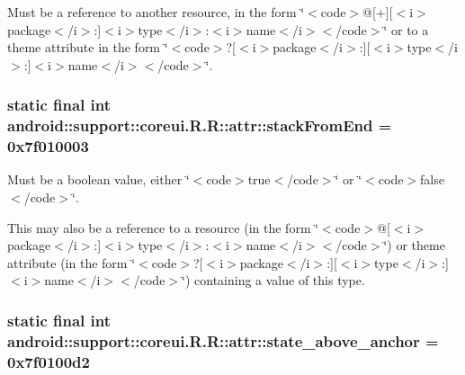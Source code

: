Must be a reference to another resource, in the form \char`\"{}$<$code$>$@\mbox{[}+\mbox{]}\mbox{[}$<$i$>$package$<$/i$>$:\mbox{]}$<$i$>$type$<$/i$>$:$<$i$>$name$<$/i$>$$<$/code$>$\char`\"{} or to a theme attribute in the form \char`\"{}$<$code$>$?\mbox{[}$<$i$>$package$<$/i$>$:\mbox{]}\mbox{[}$<$i$>$type$<$/i$>$:\mbox{]}$<$i$>$name$<$/i$>$$<$/code$>$\char`\"{}. \hypertarget{classandroid_1_1support_1_1coreui_1_1_r_1_1attr_3aa85713027b62eb331fd1fb7c1fbde0}{
\subsubsection[{stackFromEnd}]{\setlength{\rightskip}{0pt plus 5cm}static final int android::support::coreui.R.R::attr::stackFromEnd = 0x7f010003}}
\label{classandroid_1_1support_1_1coreui_1_1_r_1_1attr_3aa85713027b62eb331fd1fb7c1fbde0}


Must be a boolean value, either \char`\"{}$<$code$>$true$<$/code$>$\char`\"{} or \char`\"{}$<$code$>$false$<$/code$>$\char`\"{}. 

This may also be a reference to a resource (in the form \char`\"{}$<$code$>$@\mbox{[}$<$i$>$package$<$/i$>$:\mbox{]}$<$i$>$type$<$/i$>$:$<$i$>$name$<$/i$>$$<$/code$>$\char`\"{}) or theme attribute (in the form \char`\"{}$<$code$>$?\mbox{[}$<$i$>$package$<$/i$>$:\mbox{]}\mbox{[}$<$i$>$type$<$/i$>$:\mbox{]}$<$i$>$name$<$/i$>$$<$/code$>$\char`\"{}) containing a value of this type. \hypertarget{classandroid_1_1support_1_1coreui_1_1_r_1_1attr_bda9448177babf2df5ac91b9f0facbc1}{
\subsubsection[{state\_\-above\_\-anchor}]{\setlength{\rightskip}{0pt plus 5cm}static final int android::support::coreui.R.R::attr::state\_\-above\_\-anchor = 0x7f0100d2}}
\label{classandroid_1_1support_1_1coreui_1_1_r_1_1attr_bda9448177babf2df5ac91b9f0facbc1}



